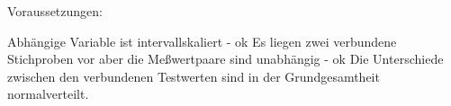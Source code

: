 \documentclass[
]{article}
\newenvironment{Shaded}{\begin{snugshade}}{\end{snugshade}}
\newcommand{\DecValTok}[1]{\textcolor[rgb]{0.00,0.00,0.81}{#1}}
\newcommand{\KeywordTok}[1]{\textcolor[rgb]{0.13,0.29,0.53}{\textbf{#1}}}
\newcommand{\NormalTok}[1]{#1}
\newcommand{\OperatorTok}[1]{\textcolor[rgb]{0.81,0.36,0.00}{\textbf{#1}}}
\newcommand{\StringTok}[1]{\textcolor[rgb]{0.31,0.60,0.02}{#1}}
\begin{document}
Voraussetzungen:

Abhängige Variable ist intervallskaliert - ok Es liegen zwei verbundene
Stichproben vor aber die Meßwertpaare sind unabhängig - ok Die
Unterschiede zwischen den verbundenen Testwerten sind in der
Grundgesamtheit normalverteilt.

\begin{Shaded}
\end{Shaded}
\end{document}
